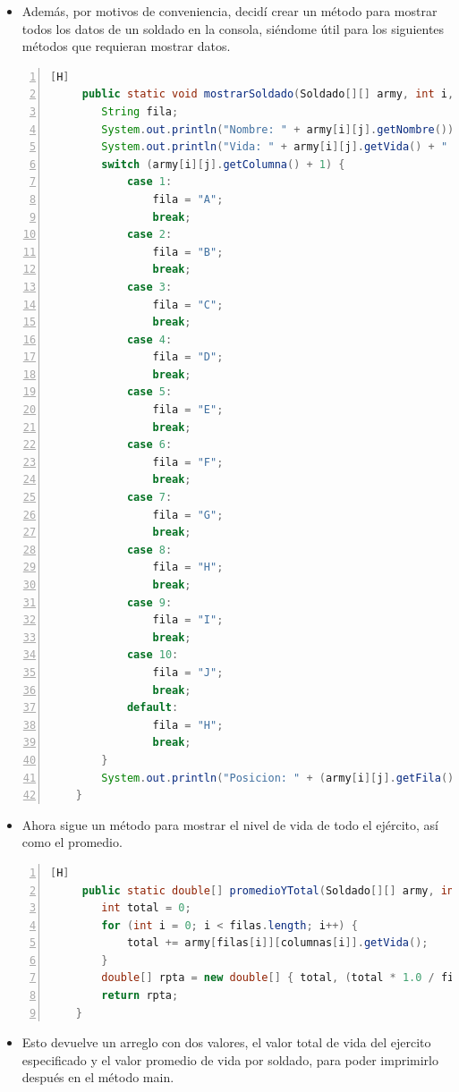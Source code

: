 \documentclass{article}
\begin{document}
	\begin{itemize}	
		\item Además, por motivos de conveniencia, decidí crear un método para mostrar todos los datos de un soldado en la consola, siéndome útil para los siguientes métodos que requieran mostrar datos.
	\end{itemize}
	\begin{lstlisting}[language=java,caption={Mostrar un soldado}, numbers=left][H]
	 public static void mostrarSoldado(Soldado[][] army, int i, int j) {
        String fila;
        System.out.println("Nombre: " + army[i][j].getNombre());
        System.out.println("Vida: " + army[i][j].getVida() + " HP");
        switch (army[i][j].getColumna() + 1) {
            case 1:
                fila = "A";
                break;
            case 2:
                fila = "B";
                break;
            case 3:
                fila = "C";
                break;
            case 4:
                fila = "D";
                break;
            case 5:
                fila = "E";
                break;
            case 6:
                fila = "F";
                break;
            case 7:
                fila = "G";
                break;
            case 8:
                fila = "H";
                break;
            case 9:
                fila = "I";
                break;
            case 10:
                fila = "J";
                break;
            default:
                fila = "H";
                break;
        }
        System.out.println("Posicion: " + (army[i][j].getFila() + 1) + "-" + fila);
    }
	\end{lstlisting}
	\begin{itemize}	
		\item Ahora sigue un método para mostrar el nivel de vida de todo el ejército, así como el promedio.
	\end{itemize}
	\begin{lstlisting}[language=java,caption={Obtener la vida total del ejército y la vida promedio}, numbers=left][H]
	 public static double[] promedioYTotal(Soldado[][] army, int[] filas, int[] columnas) {
        int total = 0;
        for (int i = 0; i < filas.length; i++) {
            total += army[filas[i]][columnas[i]].getVida();
        }
        double[] rpta = new double[] { total, (total * 1.0 / filas.length) };
        return rpta;
    }
	\end{lstlisting}
	\begin{itemize}	
		\item Esto devuelve un arreglo con dos valores, el valor total de vida del ejercito especificado y el valor promedio de vida por soldado, para poder imprimirlo después en el método main.
	\end{itemize}
\end{document}
